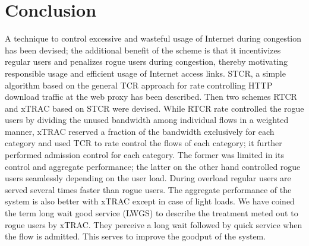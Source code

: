 \documentclass[conference]{../../IEEEtran}
\begin{document}
%





\section{Conclusion}
\label{sec:conc}
A technique to control excessive and wasteful usage of Internet during congestion has been devised; the additional benefit of the scheme is that it incentivizes regular users and penalizes rogue users during congestion, thereby motivating responsible usage and efficient usage of Internet access links. 
STCR, a simple algorithm based on the general TCR approach for rate controlling HTTP download traffic at the web proxy has been described. Then two schemes RTCR and xTRAC based on STCR were devised. While RTCR rate controlled the rogue users by dividing the unused bandwidth among individual flows in a weighted manner, xTRAC reserved a fraction of the bandwidth exclusively for each category and used TCR to rate control the flows of each category; it further performed admission control for each category. The former was limited in its control and aggregate performance; the latter on the other hand controlled rogue users seamlessly depending on the user load. During overload regular users are served several times faster than rogue users. The aggregate performance of the system is also better with xTRAC except in case of light loads. We have coined the term long wait good service (LWGS) to describe the treatment meted out to rogue users by xTRAC. They perceive a long wait followed by quick service when the flow is admitted. This serves to improve the goodput of the system.
\end{document}
